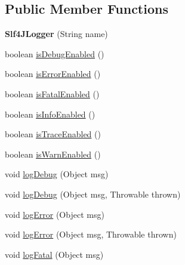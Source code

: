 \subsection*{Public Member Functions}
\begin{DoxyCompactItemize}
\item 
\mbox{\label{classcom_1_1mysql_1_1jdbc_1_1log_1_1_slf4_j_logger_a8fa1535c53f93c161094c0bc1ff56df2}} 
{\bfseries Slf4\+J\+Logger} (String name)
\item 
boolean \mbox{\hyperlink{classcom_1_1mysql_1_1jdbc_1_1log_1_1_slf4_j_logger_a3c624bc8c184e4d8790c3ee768492674}{is\+Debug\+Enabled}} ()
\item 
boolean \mbox{\hyperlink{classcom_1_1mysql_1_1jdbc_1_1log_1_1_slf4_j_logger_aeadc840396cd428c64ca320c2a0c9e5c}{is\+Error\+Enabled}} ()
\item 
boolean \mbox{\hyperlink{classcom_1_1mysql_1_1jdbc_1_1log_1_1_slf4_j_logger_a63e7f859d44fddeb866c6198900af811}{is\+Fatal\+Enabled}} ()
\item 
boolean \mbox{\hyperlink{classcom_1_1mysql_1_1jdbc_1_1log_1_1_slf4_j_logger_aa1c98d717c733fbc6f6d6e68c129f387}{is\+Info\+Enabled}} ()
\item 
boolean \mbox{\hyperlink{classcom_1_1mysql_1_1jdbc_1_1log_1_1_slf4_j_logger_a464b8fdfdb20e2b18de01ec28395419b}{is\+Trace\+Enabled}} ()
\item 
boolean \mbox{\hyperlink{classcom_1_1mysql_1_1jdbc_1_1log_1_1_slf4_j_logger_a8b7c1cc5eeb66fcc771c43645fce5802}{is\+Warn\+Enabled}} ()
\item 
void \mbox{\hyperlink{classcom_1_1mysql_1_1jdbc_1_1log_1_1_slf4_j_logger_a14878bdfd16f163e96847e3d54a4fa5a}{log\+Debug}} (Object msg)
\item 
void \mbox{\hyperlink{classcom_1_1mysql_1_1jdbc_1_1log_1_1_slf4_j_logger_a5a4a9cb3c82f4ba2b8342bd3ae8c56ce}{log\+Debug}} (Object msg, Throwable thrown)
\item 
void \mbox{\hyperlink{classcom_1_1mysql_1_1jdbc_1_1log_1_1_slf4_j_logger_a3f95d26aa1dfc7988d06649979541ef1}{log\+Error}} (Object msg)
\item 
void \mbox{\hyperlink{classcom_1_1mysql_1_1jdbc_1_1log_1_1_slf4_j_logger_ad89a6c7655848b87de7ca278e6061688}{log\+Error}} (Object msg, Throwable thrown)
\item 
void \mbox{\hyperlink{classcom_1_1mysql_1_1jdbc_1_1log_1_1_slf4_j_logger_ab003102c3b7864c6d3bb2560cff3dbfa}{log\+Fatal}} (Object msg)
\item 

\end{DoxyCompactItemize}
